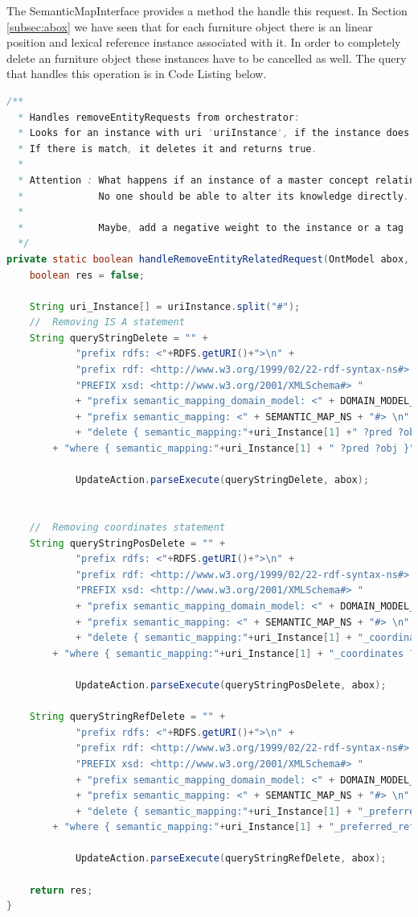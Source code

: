The SemanticMapInterface provides a method the handle this request. In Section \ref{subsec:abox} we have seen that for each furniture object there is an linear position and lexical reference instance associated with it. In order to completely delete an furniture object these instances have to be cancelled as well. The query that handles this operation is in Code Listing below.
\begin{lstlisting}[language=Java]
/**
  * Handles removeEntityRequests from orchestrator:
  *	Looks for an instance with uri 'uriInstance', if the instance does not exist returns flase.
  * If there is match, it deletes it and returns true. 
  * 
  * Attention : What happens if an instance of a master concept relating two entities is deleted?
  * 			No one should be able to alter its knowledge directly.
  *	
  * 			Maybe, add a negative weight to the instance or a tag
  */
private static boolean handleRemoveEntityRelatedRequest(OntModel abox, String uriInstance) {
	boolean res = false;

	String uri_Instance[] = uriInstance.split("#");
	//  Removing IS A statement
	String queryStringDelete = "" + 
			"prefix rdfs: <"+RDFS.getURI()+">\n" +
			"prefix rdf: <http://www.w3.org/1999/02/22-rdf-syntax-ns#> \n"+
			"PREFIX xsd: <http://www.w3.org/2001/XMLSchema#> "				
			+ "prefix semantic_mapping_domain_model: <" + DOMAIN_MODEL_NS + "#> \n"
			+ "prefix semantic_mapping: <" + SEMANTIC_MAP_NS + "#> \n"
			+ "delete { semantic_mapping:"+uri_Instance[1] +" ?pred ?obj }  "
        + "where { semantic_mapping:"+uri_Instance[1] + " ?pred ?obj }";
			
			UpdateAction.parseExecute(queryStringDelete, abox);
	

	//  Removing coordinates statement
	String queryStringPosDelete = "" + 
			"prefix rdfs: <"+RDFS.getURI()+">\n" +
			"prefix rdf: <http://www.w3.org/1999/02/22-rdf-syntax-ns#> \n"+
			"PREFIX xsd: <http://www.w3.org/2001/XMLSchema#> "				
			+ "prefix semantic_mapping_domain_model: <" + DOMAIN_MODEL_NS + "#> \n"
			+ "prefix semantic_mapping: <" + SEMANTIC_MAP_NS + "#> \n"
			+ "delete { semantic_mapping:"+uri_Instance[1] + "_coordinates ?pred ?obj }  "
        + "where { semantic_mapping:"+uri_Instance[1] + "_coordinates ?pred ?obj }";
			
			UpdateAction.parseExecute(queryStringPosDelete, abox);
	
	String queryStringRefDelete = "" + 
			"prefix rdfs: <"+RDFS.getURI()+">\n" +
			"prefix rdf: <http://www.w3.org/1999/02/22-rdf-syntax-ns#> \n"+
			"PREFIX xsd: <http://www.w3.org/2001/XMLSchema#> "				
			+ "prefix semantic_mapping_domain_model: <" + DOMAIN_MODEL_NS + "#> \n"
			+ "prefix semantic_mapping: <" + SEMANTIC_MAP_NS + "#> \n"
			+ "delete { semantic_mapping:"+uri_Instance[1] + "_preferred_reference ?pred ?obj }  "
        + "where { semantic_mapping:"+uri_Instance[1] + "_preferred_reference ?pred ?obj }";
			
			UpdateAction.parseExecute(queryStringRefDelete, abox);
			
	return res;
}
\end{lstlisting}
\label{lst:delete}

